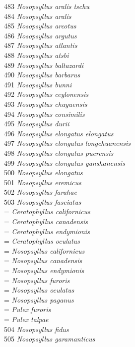 \documentclass[
]{article}
\begin{document}
483 \emph{Nosopsyllus aralis tschu}\\
484 \emph{Nosopsyllus aralis}\\
485 \emph{Nosopsyllus arcotus}\\
486 \emph{Nosopsyllus argutus}\\
487 \emph{Nosopsyllus atlantis}\\
488 \emph{Nosopsyllus atsbi}\\
489 \emph{Nosopsyllus baltazardi}\\
490 \emph{Nosopsyllus barbarus}\\
491 \emph{Nosopsyllus bunni}\\
492 \emph{Nosopsyllus ceylonensis}\\
493 \emph{Nosopsyllus chayuensis}\\
494 \emph{Nosopsyllus consimilis}\\
495 \emph{Nosopsyllus durii}\\
496 \emph{Nosopsyllus elongatus elongatus}\\
497 \emph{Nosopsyllus elongatus longchuanensis}\\
498 \emph{Nosopsyllus elongatus puerensis}\\
499 \emph{Nosopsyllus elongatus yanshanensis}\\
500 \emph{Nosopsyllus elongatus}\\
501 \emph{Nosopsyllus eremicus}\\
502 \emph{Nosopsyllus farahae}\\
503 \emph{Nosopsyllus fasciatus}\\
= \emph{Ceratophyllus californicus}\\
= \emph{Ceratophyllus canadensis}\\
= \emph{Ceratophyllus endymionis}\\
= \emph{Ceratophyllus oculatus}\\
= \emph{Nosopsyllus californicus}\\
= \emph{Nosopsyllus canadensis}\\
= \emph{Nosopsyllus endymionis}\\
= \emph{Nosopsyllus furoris}\\
= \emph{Nosopsyllus oculatus}\\
= \emph{Nosopsyllus paganus}\\
= \emph{Pulex furoris}\\
= \emph{Pulex talpae}\\
504 \emph{Nosopsyllus fidus}\\
505 \emph{Nosopsyllus garamanticus}\\
\end{document}
